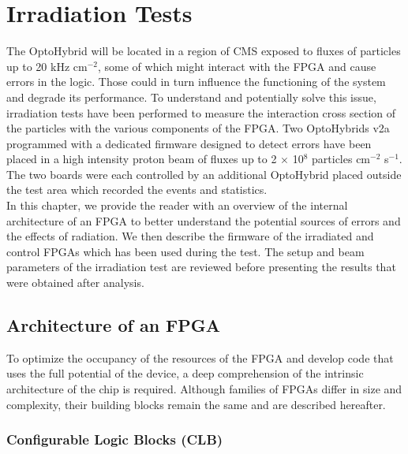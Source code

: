 \chapter{Irradiation Tests}
\label{chap:II-5-irradiation}

  The OptoHybrid will be located in a region of CMS exposed to fluxes of particles up to 20 kHz cm$^{-2}$, some of which might interact with the FPGA and cause errors in the logic. Those could in turn influence the functioning of the system and degrade its performance. To understand and potentially solve this issue, irradiation tests have been performed to measure the interaction cross section of the particles with the various components of the FPGA. Two OptoHybrids v2a programmed with a dedicated firmware designed to detect errors have been placed in a high intensity proton beam of fluxes up to 2 $ \times $ 10$^8$ particles cm$^{-2}$ s$^{-1}$. The two boards were each controlled by an additional OptoHybrid placed outside the test area which recorded the events and statistics. \\

  In this chapter, we provide the reader with an overview of the internal architecture of an FPGA to better understand the potential sources of errors and the effects of radiation. We then describe the firmware of the irradiated and control FPGAs which has been used during the test. The setup and beam parameters of the irradiation test are reviewed before presenting the results that were obtained after analysis.

  \section{Architecture of an FPGA}

    To optimize the occupancy of the resources of the FPGA and develop code that uses the full potential of the device, a deep comprehension of the intrinsic architecture of the chip is required. Although families of FPGAs differ in size and complexity, their building blocks remain the same and are described hereafter.

    \subsection{Configurable Logic Blocks (CLB)}


